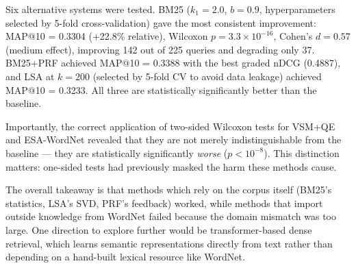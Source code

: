 \documentclass{article}
\begin{document}
Six alternative systems were tested. BM25 ($k_1{=}2.0$, $b{=}0.9$, hyperparameters selected by 5-fold cross-validation) gave the most consistent improvement: MAP@10 = 0.3304 (+22.8\% relative), Wilcoxon $p = 3.3 \times 10^{-16}$, Cohen's $d = 0.57$ (medium effect), improving 142 out of 225 queries and degrading only 37. BM25+PRF achieved MAP@10 = 0.3388 with the best graded nDCG (0.4887), and LSA at $k{=}200$ (selected by 5-fold CV to avoid data leakage) achieved MAP@10 = 0.3233. All three are statistically significantly better than the baseline.

Importantly, the correct application of two-sided Wilcoxon tests for VSM+QE and ESA-WordNet revealed that they are not merely indistinguishable from the baseline --- they are statistically significantly \emph{worse} ($p < 10^{-8}$). This distinction matters: one-sided tests had previously masked the harm these methods cause.

The overall takeaway is that methods which rely on the corpus itself (BM25's statistics, LSA's SVD, PRF's feedback) worked, while methods that import outside knowledge from WordNet failed because the domain mismatch was too large. One direction to explore further would be transformer-based dense retrieval, which learns semantic representations directly from text rather than depending on a hand-built lexical resource like WordNet.
\end{document}
